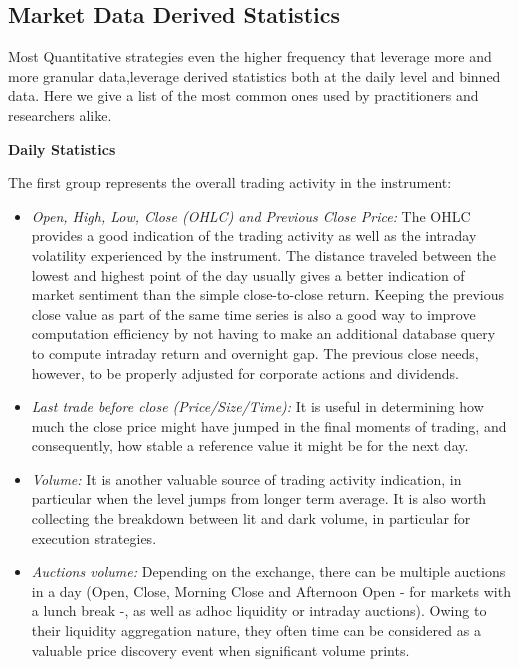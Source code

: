 \subsection{Market Data Derived Statistics}

Most Quantitative strategies even the higher frequency that leverage more and more granular data,leverage derived statistics both at the daily level and binned data. Here we give a list of the most common ones used by practitioners and researchers alike.\twomedskip


\noindent\textbf{Daily Statistics}\twomedskip

The first group represents the overall trading activity in the instrument: 

\begin{itemize}
\item \emph{Open, High, Low, Close (OHLC) and Previous Close Price:} The OHLC provides a good indication of the trading activity as well as the intraday volatility experienced by the instrument. The distance traveled between the lowest and highest point of the day usually gives a better indication of market sentiment than the simple close-to-close return. Keeping the previous close value as part of the same time series is also a good way to improve computation efficiency by not having to make an additional database query to compute intraday return and overnight gap. The previous close needs, however, to be properly adjusted for corporate actions and dividends. 


\item \emph{Last trade before close (Price/Size/Time):} It is useful in determining how much the close price might have jumped in the final moments of trading, and consequently, how stable a reference value it might be for the next day.


\item \emph{Volume:} It is another valuable source of trading activity indication, in particular when the level jumps from longer term average. It is also worth collecting the breakdown between lit and dark volume, in particular for execution strategies.


\item \emph{Auctions volume:} Depending on the exchange, there can be multiple auctions in a day (Open, Close, Morning Close and Afternoon Open - for markets with a lunch break -, as well as adhoc liquidity or intraday auctions). Owing to their liquidity aggregation nature, they often time can be considered as a valuable price discovery event when significant volume prints.



\end{itemize}
